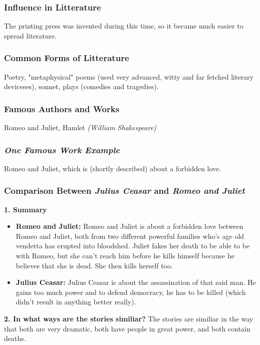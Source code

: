 \subsubsection{Influence in Litterature}
The printing press was invented during this time, so it became much easier to spread literature.

\subsubsection{Common Forms of Litterature}
Poetry, "metaphysical" poems (used very advanced, witty and far fetched literary deviceses), sonnet, plays (comedies and tragedies).

\subsubsection{Famous Authors and Works}
Romeo and Juliet, Hamlet \textit{(William Shakespeare)}

\subsubsection{\textit{One Famous Work Example}}
Romeo and Juliet, which is (shortly described) about a forbidden love.

\subsubsection{Comparison Between \textit{Julius Ceasar} and \textit{Romeo and Juliet}}
\textbf{1. Summary}
\begin{itemize}
	\item \textbf{Romeo and Juliet:} Romeo and Juliet is about a forbidden love between Romeo and Juliet, both from two different powerful families who's age old vendetta has erupted into bloodshed. Juliet fakes her death to be able to be with Romeo, but she can't reach him before he kills himself because he believes that she is dead. She then kills herself too.
	\item \textbf{Julius Ceasar:} Julius Ceasar is about the assassination of that said man. He gains too much power and to defend democracy, he has to be killed (which didn't result in anything better really).
\end{itemize}

\textbf{2. In what ways are the stories similiar?}
The stories are similiar in the way that both are very dramatic, both have people in great power, and both contain deaths.

